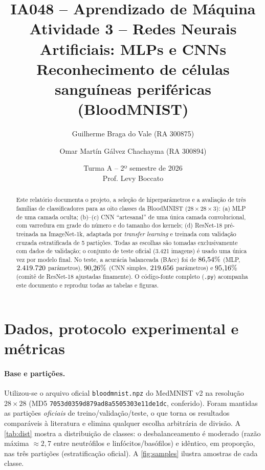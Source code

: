 \documentclass[10pt,a4paper]{article}
\title{\textbf{IA048 -- Aprendizado de Máquina}\\[2pt]
\large Atividade 3 -- Redes Neurais Artificiais: MLPs e CNNs\\
\normalsize Reconhecimento de células sanguíneas periféricas (BloodMNIST)}
\author{Guilherme Braga do Vale (RA 300875) \and Omar Martín Gálvez Chachayma (RA 300894)}
\date{Turma A -- 2º semestre de 2026 \\ Prof. Levy Boccato}
\begin{document}
\maketitle

\begin{abstract}
\noindent Este relatório documenta o projeto, a seleção de hiperparâmetros e a avaliação de três famílias de
classificadores para as oito classes da BloodMNIST ($28\times28\times3$): (a) MLP de uma camada oculta;
(b)--(c) CNN ``artesanal'' de uma única camada convolucional, com varredura em grade do número e do tamanho
dos kernels; (d) ResNet-18 pré-treinada na ImageNet-1k, adaptada por \emph{transfer learning} e treinada com
validação cruzada estratificada de 5 partições. Todas as escolhas são tomadas exclusivamente com dados de
validação; o conjunto de teste oficial (3.421 imagens) é usado uma única vez por modelo final. No teste, a
acurácia balanceada (BAcc) foi de $86{,}54\%$ (MLP, $2.419.720$ parâmetros), $90{,}26\%$ (CNN simples,
$219.656$ parâmetros) e $95{,}16\%$ (comitê de ResNet-18 ajustadas finamente). O código-fonte
completo (\texttt{.py}) acompanha este documento e reproduz todas as tabelas e figuras.
\end{abstract}

\section{Dados, protocolo experimental e métricas}\label{sec:proto}
\paragraph{Base e partições.} Utilizou-se o arquivo oficial \texttt{bloodmnist.npz} do MedMNIST v2
\cite{yang2021,acevedo2020} na resolução $28\times28$ (MD5 \texttt{7053d0359d879ad8a5505303e11de1dc},
conferido). Foram mantidas as partições \emph{oficiais} de treino/validação/teste, o que torna os resultados
comparáveis à literatura e elimina qualquer escolha arbitrária de divisão. A \cref{tab:dist} mostra a
distribuição de classes: o desbalanceamento é moderado (razão máxima $\approx 2{,}7$ entre neutrófilos e
linfócitos/basófilos) e idêntico, em proporção, nas três partições (estratificação oficial). A
\cref{fig:samples} ilustra amostras de cada classe.
\end{document}

